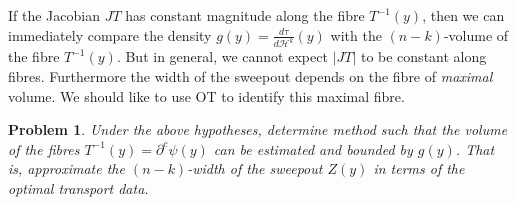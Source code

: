 \documentclass[12pt]{amsart}
\newtheorem{prob}{Problem}
\theoremstyle{remark}
\newcommand{\bZ}{\mathbb{Z}}
\newcommand{\del}{\partial}
\newcommand{\sub}{\del^c \psi(y)}
\begin{document}
If the Jacobian $JT$ has constant magnitude along the fibre $T^{-1}(y)$, then we can immediately compare the density $g(y)=\frac{d\tau}{d\mathscr{H}^{k}}(y)$ with the $(n-k)$-volume of the fibre $T^{-1}(y)$. But in general, we cannot expect $|JT|$ to be constant along fibres. Furthermore the width of the sweepout depends on the fibre of \emph{maximal} volume. We should like to use OT to identify this maximal fibre.

\begin{prob}
\label{estwid}
Under the above hypotheses, determine method such that the volume of the fibres $T^{-1}(y)=\sub$ can be estimated and bounded by $g(y)$. That is, approximate the $(n-k)$-width of the sweepout $Z(y)$ in terms of the optimal transport data.
\end{prob}
















\end{document}
